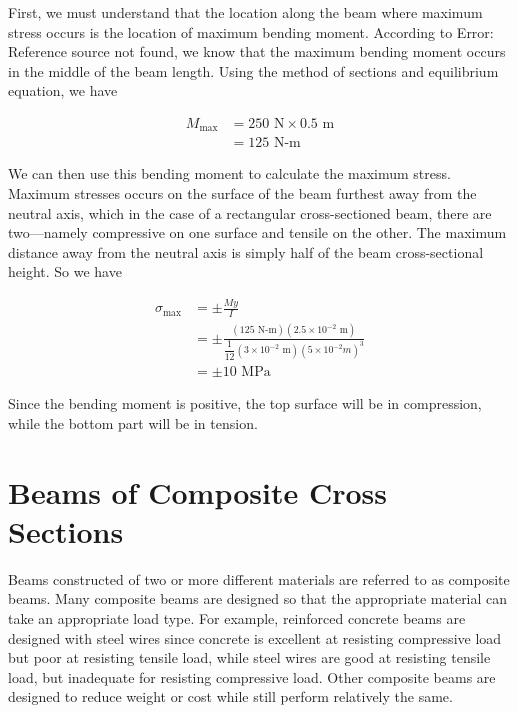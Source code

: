 \documentclass[
10pt,
a4paper,
openany,
svgnames,
]{book} %
\begin{document}
\begin{solution}
  First, we must understand that the location along the beam where maximum stress occurs is the location of maximum bending moment. According to Error: Reference source not found, we know that the maximum bending moment occurs in the middle of the beam length. Using the method of sections and equilibrium equation, we have

  \begin{align*}
    M_{\max} &= 250 \text{ N} \times 0.5 \text{ m} \\
             &= 125 \text{ N-m}
  \end{align*}
  
  We can then use this bending moment to calculate the maximum stress. Maximum stresses occurs on the surface of the beam furthest away from the neutral axis, which in the case of a rectangular cross-sectioned beam, there are two—namely compressive on one surface and tensile on the other. The maximum distance away from the neutral axis is simply half of the beam cross-sectional height. So we have
  
  \begin{align*}
    \sigma_{\max} &= \pm \frac{My}{I} \\
                  &= \pm \frac{(125 \text{ N-m})(2.5 \times 10^{-2} \text{ m})}{ \dfrac{1}{12}(3 \times 10^{-2} \text{ m})(5 \times 10^{-2} m)^3} \\
                  &= \pm 10 \text{ MPa}
  \end{align*}
  
Since the bending moment is positive, the top surface will be in compression, while the bottom part will be in tension.
\end{solution}

\section{Beams of Composite Cross Sections}

Beams constructed of two or more different materials are referred to as composite beams. Many composite beams are designed so that the appropriate material can take an appropriate load type. For example, reinforced concrete beams are designed with steel wires since concrete is excellent at resisting compressive load but poor at resisting tensile load, while steel wires are good at resisting tensile load, but inadequate for resisting compressive load. Other composite beams are designed to reduce weight or cost while still perform relatively the same.
\end{document}
